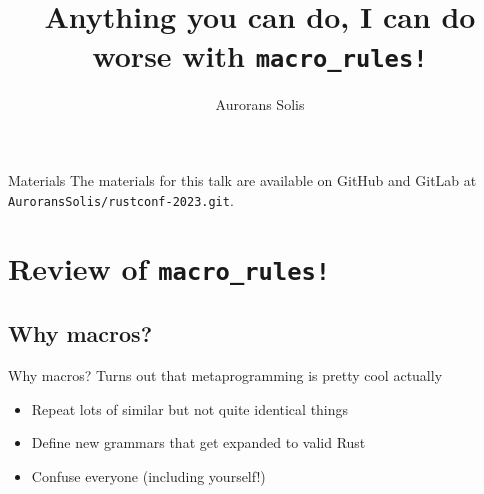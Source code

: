 \documentclass{beamer}
\title{Anything you can do, I can do worse with {\color{macrorulescolor}\texttt{macro\_rules!}}}
\author{Aurorans Solis}
\date{}
\begin{document}
	\begin{frame}
		\maketitle
	\end{frame}

	\begin{frame}{Materials}
		The materials for this talk are available on GitHub and GitLab at
		\texttt{AuroransSolis/rustconf-2023.git}.
	\end{frame}

	\section[Review of macro\_rules!]{Review of {\color{macrorulescolor}\texttt{macro\_rules!}}}
	\subsection{Why macros?}
	\begin{frame}{Why macros?}
		Turns out that metaprogramming is pretty cool actually \\

		\begin{itemize}
			\item Repeat lots of similar but not quite identical things
			\pause
			\item Define new grammars that get expanded to valid Rust
			\pause
			\item Confuse everyone (including yourself!)
		\end{itemize}
	\end{frame}
\end{document}
